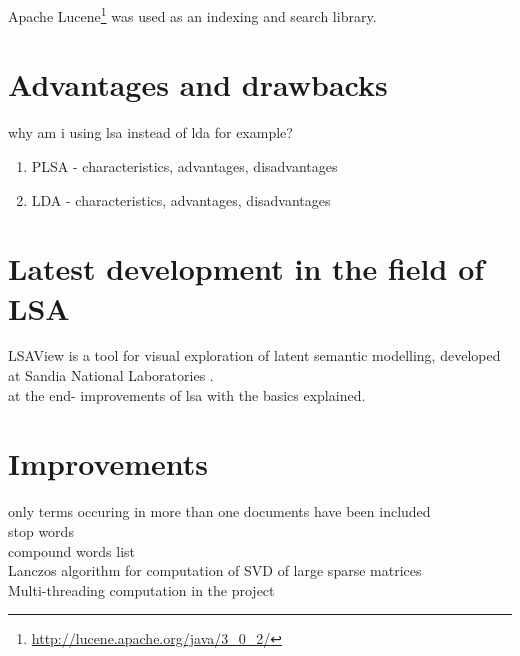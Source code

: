 Apache Lucene\footnote{\url{http://lucene.apache.org/java/3_0_2/}} was used as an indexing and search library.

\section{Advantages and drawbacks}
\label{sec:lsa:adv_disadv}

why am i using lsa instead of lda for example?\\

\begin{enumerate}
\item PLSA - characteristics, advantages, disadvantages
\item LDA - characteristics, advantages, disadvantages
\end{enumerate}

\section{Latest development in the field of LSA}
\label{sec:lsa:latest}
LSAView is a tool for visual exploration of latent semantic modelling, developed at Sandia National Laboratories \cite{CrDuSh09}.\\

at the end- improvements of lsa with the basics explained.\\

\section{Improvements}
only terms occuring in more than one documents have been included \\
stop words \\
compound words list \\
Lanczos algorithm for computation of SVD of large sparse matrices \\
Multi-threading computation in the project \\
